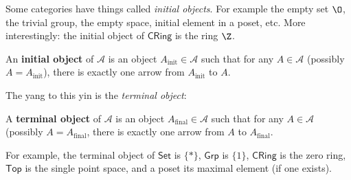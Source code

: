 \orbreak
Some categories have things called \emph{initial objects}. For example the empty set $\O$, the trivial group, the empty space, initial element in a poset, etc. More interestingly: the initial object of $\mathsf{CRing} $ is the ring $\Z$.
\begin{definition}
    An \textbf{initial object} of $\mathcal{A} $ is an object $A_{\text{init}}\in \mathcal{A} $ such that for any $A\in \mathcal{A} $ (possibly $A=A_{\text{init}}$), there is exactly one arrow from $A_{\text{init}}$ to $A$.
\end{definition}
The yang to this yin is the \emph{terminal object}:
\begin{definition}
    A \textbf{terminal object} of $\mathcal{A} $ is an object $A_{\text{final}}\in \mathcal{A} $ such that for any $A\in \mathcal{A} $ (possibly $A=A_{\text{final}}$, there is exactly one arrow from $A$ to $A_{\text{final}}$. 
\end{definition}
For example, the terminal object of $\mathsf{Set} $ is $\{*\} $, $\mathsf{Grp} $ is $\{1\} $, $\mathsf{CRing} $ is the zero ring, $\mathsf{Top} $ is the single point space, and a poset its maximal element (if one exists).

